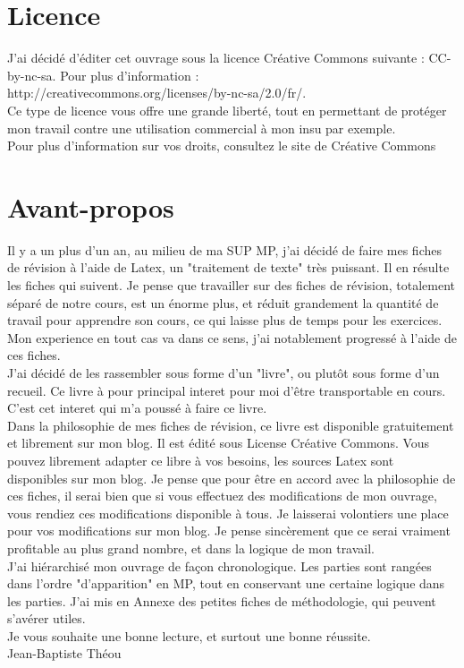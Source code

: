 \documentclass[a4paper, titlepage ,twoside]{book}
\begin{document}
\pagestyle{empty}
\titleGMPHY
\clearpage
\frontmatter                  %
\chapter{Licence}
J'ai décidé d'éditer cet ouvrage sous la licence Créative Commons suivante : CC-by-nc-sa. Pour plus d'information :\\
http://creativecommons.org/licenses/by-nc-sa/2.0/fr/.\\
Ce type de licence vous offre une grande liberté, tout en permettant de protéger mon travail contre une utilisation commercial à mon insu par exemple.\\
Pour plus d'information sur vos droits, consultez le site de Créative Commons
\chapter{Avant-propos}
Il y a un plus d'un an, au milieu de ma SUP MP, j'ai décidé de faire mes fiches de révision à l'aide de Latex, un "traitement de texte" très puissant. Il en résulte les fiches qui suivent. Je pense que travailler sur des fiches de révision, totalement séparé de notre cours, est un énorme plus, et réduit grandement la quantité de travail pour apprendre son cours, ce qui laisse plus de temps pour les exercices. Mon experience en tout cas va dans ce sens, j'ai notablement progressé à l'aide de ces fiches.\\
J'ai décidé de les rassembler sous forme d'un "livre", ou plutôt sous forme d'un recueil. Ce livre à pour principal interet pour moi d'être transportable en cours. C'est cet interet qui m'a poussé à faire ce livre.\\
Dans la philosophie de mes fiches de révision, ce livre est disponible gratuitement et librement sur mon blog. Il est édité sous License Créative Commons. Vous pouvez librement adapter ce libre à vos besoins, les sources Latex sont disponibles sur mon blog. Je pense que pour être en accord avec la philosophie de ces fiches, il serai bien que si vous effectuez des modifications de mon ouvrage, vous rendiez ces modifications disponible à tous. Je laisserai volontiers une place pour vos modifications sur mon blog. Je pense sincèrement que ce serai vraiment profitable au plus grand nombre, et dans la logique de mon travail.\\
J'ai hiérarchisé mon ouvrage de façon chronologique. Les parties sont rangées dans l'ordre "d'apparition" en MP, tout en conservant une certaine logique dans les parties. J'ai mis en Annexe des petites fiches de méthodologie, qui peuvent s'avérer utiles.\\
Je vous souhaite une bonne lecture, et surtout une bonne réussite.\\
Jean-Baptiste Théou
\end{document}

